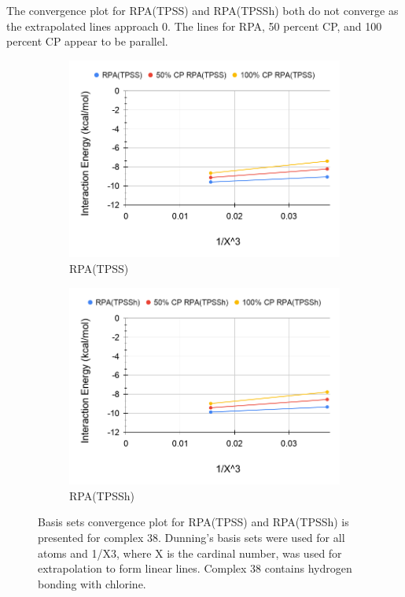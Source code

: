 \documentclass[11pt]{article}
\begin{document}
The convergence plot for RPA(TPSS) and RPA(TPSSh) both do not converge
as the extrapolated lines approach 0. The lines for RPA, 50 percent CP,
and 100 percent CP appear to be parallel.

\begin{figure}[H]
  \centering
  \begin{subfigure}{.5\textwidth}
    \centering
    \includegraphics[scale=0.3]{tpss-38.png}
    \caption{RPA(TPSS)}
    \label{fig:tpss_38}
  \end{subfigure}%
  \begin{subfigure}{.5\textwidth}
    \centering
    \includegraphics[scale=0.3]{tpssh-38.png}
    \caption{RPA(TPSSh)}
    \label{fig:tpssh_38}
  \end{subfigure}
  \caption{Basis sets convergence plot for RPA(TPSS) and RPA(TPSSh) is
    presented for complex 38. Dunning's basis sets were used for all
    atoms and 1/X3, where X is the cardinal number, was used for
    extrapolation to form linear lines. Complex 38 contains hydrogen
    bonding with chlorine.}
  \label{fig:complex_38}
\end{figure}
\end{document}
